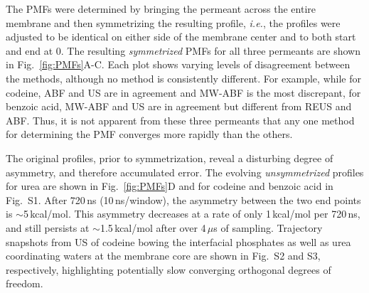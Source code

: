   \par The PMFs were determined by bringing the permeant across the entire membrane and then symmetrizing the resulting profile, {\it i.e.}, the profiles were adjusted to be identical on either side of the membrane center and to both start and end at 0.  The resulting {\it symmetrized} PMFs for all three permeants are shown in Fig.~\ref{fig:PMFs}A-C.  Each plot shows varying levels of disagreement between the methods, although no method is consistently different.  For example, while for codeine, ABF and US are in agreement and MW-ABF is the most discrepant, for benzoic acid, MW-ABF and US are in agreement but different from REUS and ABF.  Thus, it is not apparent from these three permeants that any one method for determining the PMF converges more rapidly than the others.

  \par The original profiles, prior to symmetrization, reveal a disturbing degree of asymmetry, and therefore accumulated error.  The evolving {\it unsymmetrized} profiles for urea are shown in Fig.~\ref{fig:PMFs}D {\color{red} and for codeine and benzoic acid in Fig.~S1}.  After 720\,ns (10\,ns/window), the asymmetry between the two end points is $\sim$5\,kcal/mol.  This asymmetry decreases at a rate of only 1\,kcal/mol per 720\,ns, and still persists at $\sim$1.5\,kcal/mol after over 4\,$\mu$s of sampling. Trajectory snapshots from US of codeine bowing the interfacial phosphates as well as urea coordinating waters at the membrane core are shown in Fig.~S2 and S3, respectively, highlighting potentially slow converging orthogonal degrees of freedom.

